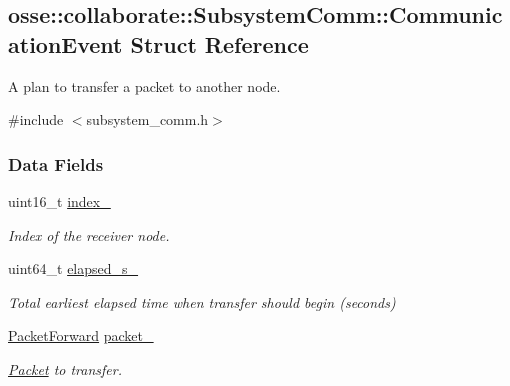 \hypertarget{structosse_1_1collaborate_1_1_subsystem_comm_1_1_communication_event}{}\subsection{osse\+:\+:collaborate\+:\+:Subsystem\+Comm\+:\+:Communication\+Event Struct Reference}
\label{structosse_1_1collaborate_1_1_subsystem_comm_1_1_communication_event}


A plan to transfer a packet to another node.  




{\ttfamily \#include $<$subsystem\+\_\+comm.\+h$>$}

\subsubsection*{Data Fields}
\begin{DoxyCompactItemize}
\item 
\mbox{\label{structosse_1_1collaborate_1_1_subsystem_comm_1_1_communication_event_aead594fdeec1324272f4329c95c6238b}} 
uint16\+\_\+t \hyperlink{structosse_1_1collaborate_1_1_subsystem_comm_1_1_communication_event_aead594fdeec1324272f4329c95c6238b}{index\+\_\+}
\begin{DoxyCompactList}\small\item\em Index of the receiver node. \end{DoxyCompactList}\item 
\mbox{\label{structosse_1_1collaborate_1_1_subsystem_comm_1_1_communication_event_aacc073aa04b27d099f7d2ad5ab5f8f93}} 
uint64\+\_\+t \hyperlink{structosse_1_1collaborate_1_1_subsystem_comm_1_1_communication_event_aacc073aa04b27d099f7d2ad5ab5f8f93}{elapsed\+\_\+s\+\_\+}
\begin{DoxyCompactList}\small\item\em Total earliest elapsed time when transfer should begin (seconds) \end{DoxyCompactList}\item 
\mbox{\label{structosse_1_1collaborate_1_1_subsystem_comm_1_1_communication_event_a5a93bd31cd61a81f8aba9b1cf298e183}} 
\hyperlink{classosse_1_1collaborate_1_1_packet_forward}{Packet\+Forward} \hyperlink{structosse_1_1collaborate_1_1_subsystem_comm_1_1_communication_event_a5a93bd31cd61a81f8aba9b1cf298e183}{packet\+\_\+}
\begin{DoxyCompactList}\small\item\em \hyperlink{classosse_1_1collaborate_1_1_packet}{Packet} to transfer. \end{DoxyCompactList}\end{DoxyCompactItemize}


